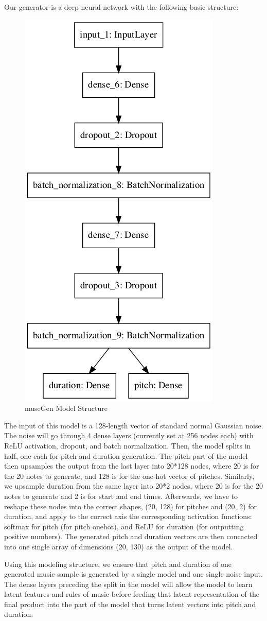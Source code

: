 \documentclass[12pt,oneside]{chicagocapstone}
\begin{document}
Our generator is a deep neural network with the following basic structure:
\begin{figure}

{\centering \includegraphics[width=0.3\linewidth]{figure/model_terryjosh} 

}

\caption{museGen Model Structure}\label{fig:unnamed-chunk-2}
\end{figure}
The input of this model is a 128-length vector of standard normal Gaussian noise. The noise will go through 4 dense layers (currently set at 256 nodes each) with ReLU activation, dropout, and batch normalization. Then, the model splits in half, one each for pitch and duration generation. The pitch part of the model then upsamples the output from the last layer into 20*128 nodes, where 20 is for the 20 notes to generate, and 128 is for the one-hot vector of pitches. Similarly, we upsample duration from the same layer into 20*2 nodes, where 20 is for the 20 notes to generate and 2 is for start and end times. Afterwards, we have to reshape these nodes into the correct shapes, (20, 128) for pitches and (20, 2) for duration, and apply to the correct axis the corresponding activation functions: softmax for pitch (for pitch onehot), and ReLU for duration (for outputting positive numbers). The generated pitch and duration vectors are then concacted into one single array of dimensions (20, 130) as the output of the model.

Using this modeling structure, we ensure that pitch and duration of one generated music sample is generated by a single model and one single noise input. The dense layers preceding the split in the model will allow the model to learn latent features and rules of music before feeding that latent representation of the final product into the part of the model that turns latent vectors into pitch and duration.
\end{document}
